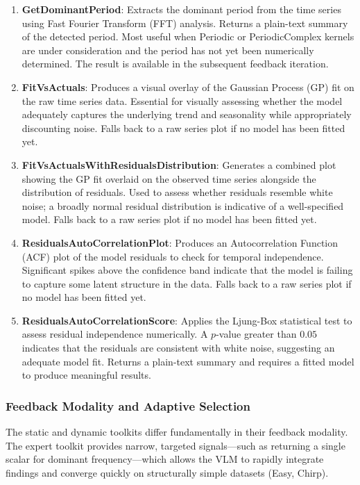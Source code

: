 \documentclass{article}
\begin{document}
\begin{enumerate}
    \item \textbf{GetDominantPeriod}: Extracts the dominant period from the time series 
    using Fast Fourier Transform (FFT) analysis. Returns a plain-text summary of the detected 
    period. Most useful when Periodic or PeriodicComplex kernels are under consideration and 
    the period has not yet been numerically determined. The result is available in the 
    subsequent feedback iteration.

    \item \textbf{FitVsActuals}: Produces a visual overlay of the Gaussian Process (GP) 
    fit on the raw time series data. Essential for visually assessing whether the model 
    adequately captures the underlying trend and seasonality while appropriately discounting 
    noise. Falls back to a raw series plot if no model has been fitted yet.

    \item \textbf{FitVsActualsWithResidualsDistribution}: Generates a combined plot 
    showing the GP fit overlaid on the observed time series alongside the distribution of 
    residuals. Used to assess whether residuals resemble white noise; a broadly normal 
    residual distribution is indicative of a well-specified model. Falls back to a raw 
    series plot if no model has been fitted yet.

    \item \textbf{ResidualsAutoCorrelationPlot}: Produces an Autocorrelation Function 
    (ACF) plot of the model residuals to check for temporal independence. Significant spikes 
    above the confidence band indicate that the model is failing to capture some latent 
    structure in the data. Falls back to a raw series plot if no model has been fitted yet.

    \item \textbf{ResidualsAutoCorrelationScore}: Applies the Ljung-Box statistical test 
    to assess residual independence numerically. A $p$-value greater than $0.05$ indicates 
    that the residuals are consistent with white noise, suggesting an adequate model fit. 
    Returns a plain-text summary and requires a fitted model to produce meaningful results.
\end{enumerate}

\subsubsection{Feedback Modality and Adaptive Selection}
The static and dynamic toolkits differ fundamentally in their feedback modality. The expert toolkit provides narrow, targeted signals---such as returning a single scalar for dominant frequency---which allows the VLM to rapidly integrate findings and converge quickly on structurally simple datasets (Easy, Chirp). 
\end{document}
